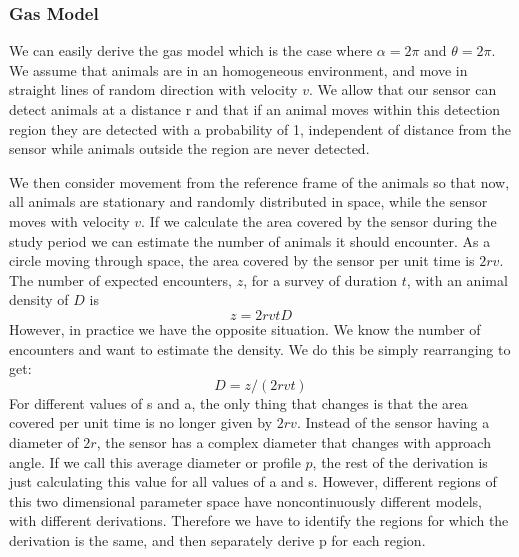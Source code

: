 \documentclass[a4paper,10pt,reqno,oneside]{amsart}
\begin{document}
\subsubsection{Gas Model}

We can easily derive the gas model which is the case where $ \alpha =  2\pi$ and $ \theta =  2\pi$. We assume that animals are in an homogeneous environment, and move in straight lines of random direction with velocity $v$. We allow that our sensor can detect animals at a distance r and that if an animal moves within this detection region they are detected with a probability of 1, independent of distance from the sensor while animals outside the region are never detected.

We then consider movement from the reference frame of the animals so that now, all animals are stationary and randomly distributed in space, while the sensor moves with velocity $v$. If we calculate the area covered by the sensor during the study period we can estimate the number of animals it should encounter. As a circle moving through space, the area covered by the sensor per unit time is $2rv$. The number of expected encounters, $z$, for a survey of duration $t$, with an animal density of $D$ is
\begin{equation}
	z = 2rvtD
\end{equation}
However, in practice we have the opposite situation. We know the number of encounters and want to estimate the density. We do this be simply rearranging to get:
\begin{equation}
	D = z/(2rvt)
\end{equation}
For different values of s and a, the only thing that changes is that the area covered per unit time is no longer given by $2rv$. Instead of the sensor having a diameter of $2r$, the sensor has a complex diameter that changes with approach angle. If we call this average diameter or profile $p$, the rest of the derivation is just calculating this value for all values of a and s. However, different regions of this two dimensional parameter space have noncontinuously different models, with different derivations. Therefore we have to identify the regions for which the derivation is the same, and then separately derive p for each region.
\end{document}
